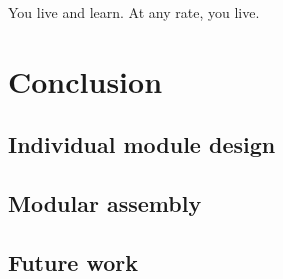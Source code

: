 \begin{savequote}[8cm]
You live and learn. At any rate, you live.
\end{savequote}

\chapter{Conclusion}

\section{Individual module design}

\section{Modular assembly}

\section{Future work}